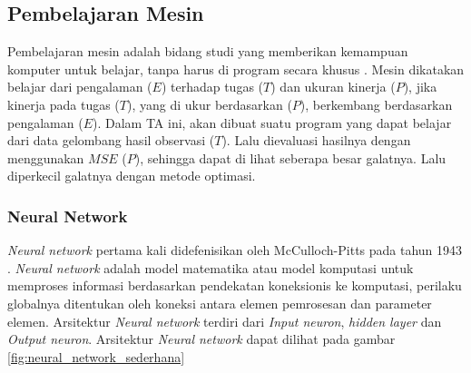 \subsection{Pembelajaran Mesin}

Pembelajaran mesin adalah bidang studi yang memberikan kemampuan komputer untuk belajar, tanpa harus di program secara khusus \cite{arthur_l_samuel_1959}. Mesin dikatakan belajar dari pengalaman ($E$) terhadap tugas ($T$) dan ukuran kinerja ($P$), jika kinerja pada tugas ($T$), yang di ukur berdasarkan ($P$), berkembang berdasarkan pengalaman ($E$). Dalam TA ini, akan dibuat suatu program yang dapat belajar dari data gelombang hasil observasi ($T$). Lalu dievaluasi hasilnya dengan menggunakan $MSE$ ($P$), sehingga dapat di lihat seberapa besar galatnya. Lalu diperkecil galatnya dengan metode optimasi.



\subsubsection{Neural Network}

\emph{Neural network} pertama kali didefenisikan oleh McCulloch-Pitts pada tahun 1943 \cite{McCulloch1943}. \emph{Neural network} adalah model matematika atau model komputasi untuk memproses informasi berdasarkan pendekatan koneksionis ke komputasi, perilaku globalnya ditentukan oleh koneksi antara elemen pemrosesan dan parameter elemen\cite{gurney2014introduction}.
Arsitektur \emph{Neural network} terdiri dari \emph{Input neuron}, \emph{hidden layer} dan \emph{Output neuron}. Arsitektur \emph{Neural network} dapat dilihat pada gambar 
\ref{fig:neural_network_sederhana}

